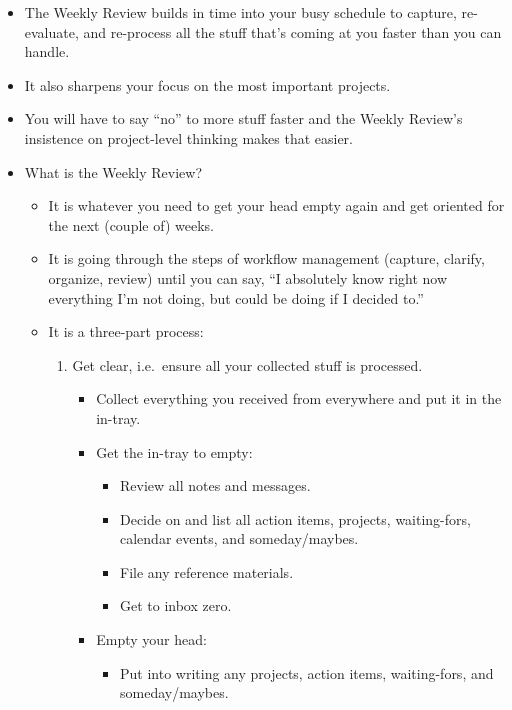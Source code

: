 \documentclass{article}
\begin{document}
\begin{itemize}
  \item The Weekly Review builds in time into your busy schedule to capture, re-evaluate, and re-process all the stuff that's coming at you faster than you can handle.
  \item It also sharpens your focus on the most important projects.
  \item You will have to say ``no'' to more stuff faster and the Weekly Review's insistence on project-level thinking makes that easier.
  \item What is the Weekly Review?
  \begin{itemize}
    \item It is whatever you need to get your head empty again and get oriented for the next (couple of) weeks.
    \item It is going through the steps of workflow management (capture, clarify, organize, review) until you can say, ``I absolutely know right now everything I'm not doing, but could be doing if I decided to.''
    \item It is a three-part process:
    \begin{enumerate}
        \item Get clear, i.e.\ ensure all your collected stuff is processed.
        \begin{itemize}
          \item Collect everything you received from everywhere and put it in the in-tray.
          \item Get the in-tray to empty:
          \begin{itemize}
              \item Review all notes and messages.
              \item Decide on and list all action items, projects, waiting-fors, calendar events, and someday/maybes.
              \item File any reference materials.
              \item Get to inbox zero.
          \end{itemize}
          \item Empty your head:
          \begin{itemize}
            \item Put into writing any projects, action items, waiting-fors, and someday/maybes.
          \end{itemize}
        \end{itemize}

\end{enumerate}
\end{itemize}
\end{itemize}
\end{document}
